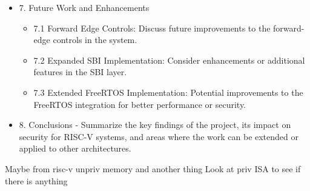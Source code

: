 \begin{itemize}
  \item 7. Future Work and Enhancements
    \begin{itemize}
      \item 7.1 Forward Edge Controls: Discuss future improvements to the
        forward-edge controls in the system.

      \item 7.2 Expanded SBI Implementation: Consider enhancements or additional
        features in the SBI layer.

      \item 7.3 Extended FreeRTOS Implementation: Potential improvements to the
        FreeRTOS integration for better performance or security.
    \end{itemize}

  \item 8. Conclusions - Summarize the key findings of the project, its impact
    on security for RISC-V systems, and areas where the work can be extended or applied
    to other architectures.
\end{itemize}

Maybe from risc-v unpriv memory and another thing Look at priv ISA to see if
there is anything
